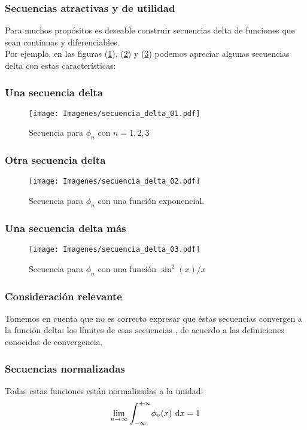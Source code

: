 \documentclass[12pt]{beamer}
\begin{document}
\begin{frame}
\frametitle{Secuencias atractivas y de utilidad}
Para muchos propósitos es deseable construir secuencias delta de funciones que sean continuas y diferenciables.
\\
\bigskip
\pause 
Por ejemplo, en las figuras (\ref{fig:plot_secuencia_01}), (\ref{fig:plot_secuencia_02}) y (\ref{fig:plot_secuencia_03}) podemos apreciar algunas secuencias delta con estas características:
\end{frame}

\begin{frame}[plain]
\frametitle{Una secuencia delta}
\begin{figure}[H]
    \centering
    \texttt{[image: Imagenes/secuencia\_delta\_01.pdf]}
    \caption{Secuencia para $\phi_{n}$ con $n=1,2,3$}
    \label{fig:plot_secuencia_01}
\end{figure}
\end{frame}

\begin{frame}
\frametitle{Otra secuencia delta}
\begin{figure}[H]
    \centering
    \texttt{[image: Imagenes/secuencia\_delta\_02.pdf]}
    \caption{Secuencia para $\phi_{n}$ con una función exponencial.}
    \label{fig:plot_secuencia_02}
\end{figure}
\end{frame}

\begin{frame}
\frametitle{Una secuencia delta más}
\begin{figure}[H]
    \centering
    \texttt{[image: Imagenes/secuencia\_delta\_03.pdf]}
    \caption{Secuencia para $\phi_{n}$ con una función $\sin^{2}(x)/x$}
    \label{fig:plot_secuencia_03}
\end{figure}
\end{frame}

\begin{frame}
\frametitle{Consideración relevante}
Tomemos en cuenta que no es correcto expresar que éstas secuencias convergen a la función delta: \pause los límites de esas secuencias , de acuerdo a las definiciones conocidas de convergencia.
\end{frame}

\begin{frame}
\frametitle{Secuencias normalizadas}
Todas estas funciones están normalizadas a la unidad:
\pause
\begin{equation}
\lim_{n \to \infty} \scaleint{6ex}_{\bs - \infty}^{+ \infty} \phi_{n} (x) \: \dd{x} = 1
\label{eq:ecuacion_delta_05}
\end{equation}
\end{frame}
\end{document}
